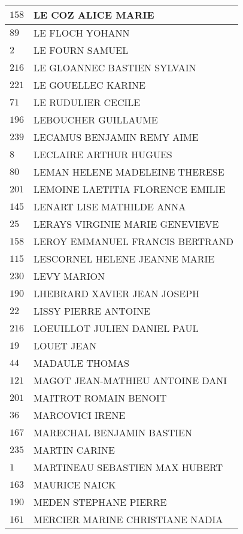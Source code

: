 \begin{xltabular}{\linewidth}{|l|X|}
    \hline
    $158$ & LE COZ ALICE MARIE \\
    \hline
    $89$ & LE FLOCH YOHANN \\
    \hline
    $2$ & LE FOURN SAMUEL \\
    \hline
    $216$ & LE GLOANNEC BASTIEN SYLVAIN \\
    \hline
    $221$ & LE GOUELLEC KARINE \\
    \hline
    $71$ & LE RUDULIER CECILE \\
    \hline
    $196$ & LEBOUCHER GUILLAUME \\
    \hline
    $239$ & LECAMUS BENJAMIN REMY AIME \\
    \hline
    $8$ & LECLAIRE ARTHUR HUGUES \\
    \hline
    $80$ & LEMAN HELENE MADELEINE THERESE \\
    \hline
    $201$ & LEMOINE LAETITIA FLORENCE EMILIE \\
    \hline
    $145$ & LENART LISE MATHILDE ANNA \\
    \hline
    $25$ & LERAYS VIRGINIE MARIE GENEVIEVE \\
    \hline
    $158$ & LEROY EMMANUEL FRANCIS BERTRAND \\
    \hline
    $115$ & LESCORNEL HELENE JEANNE MARIE \\
    \hline
    $230$ & LEVY MARION \\
    \hline
    $190$ & LHEBRARD XAVIER JEAN JOSEPH \\
    \hline
    $22$ & LISSY PIERRE ANTOINE \\
    \hline
    $216$ & LOEUILLOT JULIEN DANIEL PAUL \\
    \hline
    $19$ & LOUET JEAN \\
    \hline
    $44$ & MADAULE THOMAS \\
    \hline
    $121$ & MAGOT JEAN-MATHIEU ANTOINE DANI \\
    \hline
    $201$ & MAITROT ROMAIN BENOIT \\
    \hline
    $36$ & MARCOVICI IRENE \\
    \hline
    $167$ & MARECHAL BENJAMIN BASTIEN \\
    \hline
    $235$ & MARTIN CARINE \\
    \hline
    $1$ & MARTINEAU SEBASTIEN MAX HUBERT \\
    \hline
    $163$ & MAURICE NAICK \\
    \hline
    $190$ & MEDEN STEPHANE PIERRE \\
    \hline
    $161$ & MERCIER MARINE CHRISTIANE NADIA \\

\end{xltabular}
